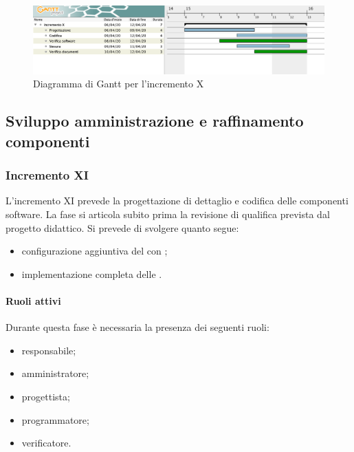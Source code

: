 		\begin{landscape}
          \begin{figure}[H]
            \centering
            \includegraphics[width=\linewidth]{images/gantt/incrementoX} %
            \caption{Diagramma di Gantt per l'incremento X}
          \end{figure}		
		\end{landscape}

		
		\subsection{Sviluppo amministrazione e raffinamento componenti}
			
		\subsubsection{Incremento XI}
			
			L'incremento XI prevede la progettazione di dettaglio e codifica delle componenti software. La fase si articola subito prima la revisione di qualifica prevista dal progetto didattico. Si prevede di svolgere quanto segue:
			\begin{itemize}
				\item configurazione aggiuntiva del  con ;
				\item implementazione completa delle .
			\end{itemize}
			
			\paragraph{Ruoli attivi}
			
				Durante questa fase è necessaria la presenza dei seguenti ruoli:
				\begin{itemize}
					\item responsabile;
					\item amministratore;
					\item progettista;
					\item programmatore;
					\item verificatore.
				\end{itemize}
			
